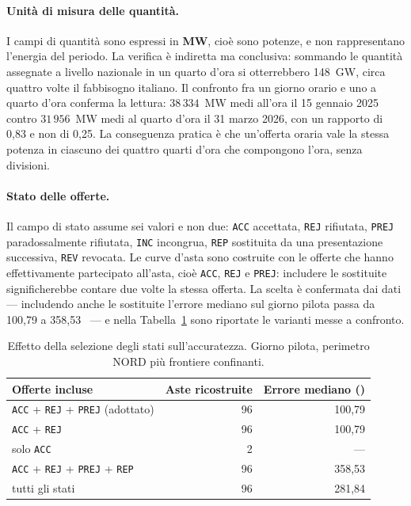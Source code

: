 \paragraph{Unit\`a di misura delle quantit\`a.} I campi di quantit\`a sono espressi in
\textbf{MW}, cio\`e sono potenze, e non rappresentano l'energia del periodo. La verifica \`e
indiretta ma conclusiva: sommando le quantit\`a assegnate a livello nazionale in un quarto
d'ora si otterrebbero 148~GW, circa quattro volte il fabbisogno italiano. Il confronto fra un
giorno orario e uno a quarto d'ora conferma la lettura: $38\,334$~MW medi all'ora il
15 gennaio 2025 contro $31\,956$~MW medi al quarto d'ora il 31 marzo 2026, con un rapporto di
0{,}83 e non di 0{,}25. La conseguenza pratica \`e che un'offerta oraria vale la stessa
potenza in ciascuno dei quattro quarti d'ora che compongono l'ora, senza divisioni.

\paragraph{Stato delle offerte.} Il campo di stato assume sei valori e non due:
\texttt{ACC} accettata, \texttt{REJ} rifiutata, \texttt{PREJ} paradossalmente rifiutata,
\texttt{INC} incongrua, \texttt{REP} sostituita da una presentazione successiva,
\texttt{REV} revocata. Le curve d'asta sono costruite con le offerte che hanno effettivamente
partecipato all'asta, cio\`e \texttt{ACC}, \texttt{REJ} e \texttt{PREJ}: includere le
sostituite significherebbe contare due volte la stessa offerta. La scelta \`e confermata dai
dati — includendo anche le sostituite l'errore mediano sul giorno pilota passa da
100{,}79 a 358{,}53~\euromwh{} — e nella Tabella~\ref{tab:stati} sono riportate le varianti
messe a confronto.

\begin{table}[H]
\centering
\caption{Effetto della selezione degli stati sull'accuratezza. Giorno pilota, perimetro NORD
         più frontiere confinanti.}
\label{tab:stati}
\begin{tabular}{@{}lrr@{}}
\toprule
\textbf{Offerte incluse} & \textbf{Aste ricostruite} & \textbf{Errore mediano (\euromwh{})} \\
\midrule
\texttt{ACC} + \texttt{REJ} + \texttt{PREJ} (adottato) & 96 & 100{,}79 \\
\texttt{ACC} + \texttt{REJ}                            & 96 & 100{,}79 \\
solo \texttt{ACC}                                      &  2 & --- \\
\texttt{ACC} + \texttt{REJ} + \texttt{PREJ} + \texttt{REP} & 96 & 358{,}53 \\
tutti gli stati                                        & 96 & 281{,}84 \\
\bottomrule
\end{tabular}
\end{table}

